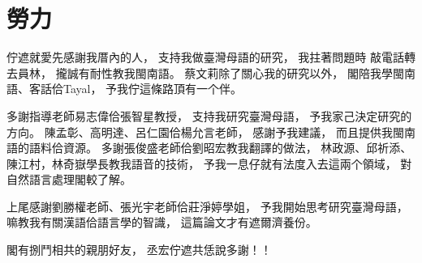 \chapter{勞力}
佇遮就愛先感謝我厝內的人，
支持我做臺灣母語的研究，
我拄著問題時
敲電話轉去員林，
攏誠有耐性教我閩南語。
蔡文莉除了關心我的研究以外，
閣陪我學閩南語、客話佮Tayal，
予我佇這條路頂有一个伴。

多謝指導老師易志偉佮張智星教授，
支持我研究臺灣母語，
予我家己決定研究的方向。
陳孟彰、高明達、呂仁園佮楊允言老師，
感謝予我建議，
而且提供我閩南語的語料佮資源。
多謝張俊盛老師佮劉昭宏教我翻譯的做法，
林政源、邱祈添、陳江村，林奇嶽學長教我語音的技術，
予我一息仔就有法度入去這兩个領域，
對自然語言處理閣較了解。

上尾感謝劉勝權老師、張光宇老師佮莊淨婷學姐，
予我開始思考研究臺灣母語，
嘛教我有關漢語佮語言學的智識，
這篇論文才有遮爾濟養份。

閣有捌鬥相共的親朋好友，
丞宏佇遮共恁說多謝！！
